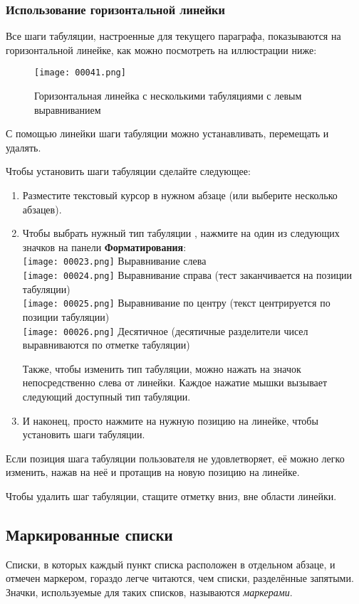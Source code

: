 ﻿\documentclass[a4paper,10pt]{article}
\begin{document}
\subsubsection{Использование горизонтальной линейки}
Все шаги табуляции, настроенные для текущего параграфа, показываются на горизонтальной линейке, как можно посмотреть на иллюстрации ниже:

\begin{figure}[ht]
\texttt{[image: 00041.png]}
\centering
\caption{Горизонтальная линейка с несколькими табуляциями с левым выравниванием}
\end{figure}

С помощью линейки шаги табуляции можно устанавливать, перемещать и удалять.

Чтобы установить шаги табуляции сделайте следующее:
\begin{enumerate}
 \item Разместите текстовый курсор в нужном абзаце (или выберите несколько абзацев).
 \item Чтобы выбрать нужный тип табуляции , нажмите на один из следующих значков на панели \textbf{Форматирования}:\\
 \texttt{[image: 00023.png]} Выравнивание слева\\
 \texttt{[image: 00024.png]} Выравнивание справа (тест заканчивается на позиции табуляции)\\
 \texttt{[image: 00025.png]} Выравнивание по центру (текст центрируется по позиции табуляции)\\
 \texttt{[image: 00026.png]} Десятичное (десятичные разделители чисел выравниваются по отметке табуляции)
 
 Также, чтобы изменить тип табуляции, можно нажать на значок непосредственно слева от линейки. Каждое нажатие мышки вызывает следующий доступный тип табуляции.
 \item И наконец, просто нажмите на нужную позицию на линейке, чтобы установить шаги табуляции.
\end{enumerate}

Если позиция шага табуляции пользователя не удовлетворяет, её можно легко изменить, нажав на неё и протащив на новую позицию на линейке.

Чтобы удалить шаг табуляции, стащите отметку вниз, вне области линейки.

\subsection{Маркированные списки} \label{sec:маркированнсписки}
Списки, в которых каждый пункт списка расположен в отдельном абзаце, и отмечен маркером, гораздо легче читаются, чем списки, разделённые запятыми. Значки, используемые для таких списков, называются \textit{маркерами}.
\end{document}
